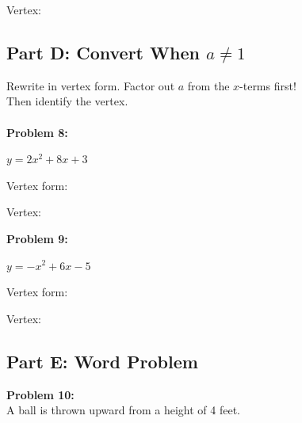 \documentclass[12pt]{article}
\begin{document}
			\vspace{1cm}

			Vertex: \underline{\hspace{2in}}

			\newpage

		\subsection*{Part D: Convert When $a \neq 1$}

			Rewrite in vertex form. Factor out $a$ from the $x$-terms first!\\

			Then identify the vertex.\\\\

			\textbf{Problem 8:}
            
            $y = 2x^2 + 8x + 3$

			\vspace{4cm}

			Vertex form: \underline{\hspace{3in}}

			\vspace{1cm}

			Vertex: \underline{\hspace{2in}}

			\vspace{1cm}

			\textbf{Problem 9:}
            
            $y = -x^2 + 6x - 5$

			\vspace{4cm}

			Vertex form: \underline{\hspace{3in}}

			\vspace{1cm}

			Vertex: \underline{\hspace{2in}}

			\newpage

		\subsection*{Part E: Word Problem}

			\textbf{Problem 10:}\\

			A ball is thrown upward from a height of 4 feet.\\
\end{document}
